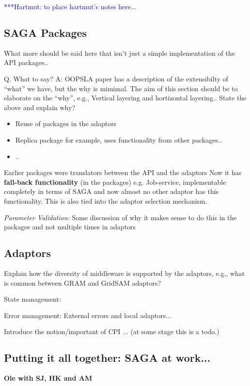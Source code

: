 \documentclass[10pt,letterpaper]{article}
\newcommand{\hknote}[1]{ {\textcolor{blue}    { ***Hartmut:   #1 }}}
\newcommand{\hknote}[1]{}
\begin{document}
\hknote{to place hartmut's notes here... }

\subsection{SAGA Packages}

What more should be said here that isn't just a simple implementation
of the API packages.. 

Q. What to say?  A: OOPSLA paper has a description of the extensibilty
of ``what'' we have, but the why is mimimal. The aim of this section
should be to elaborate on the ``why'', e.g., Vertical layering and
hortizontal layering..  State the above and explain why?

\begin{itemize}
\item Reuse of packages in the adaptors
\item Replica package for example, uses functionality from other packages..
\item ..
\end{itemize}

Earlier packages were translators between the API and the adaptors Now
it has {\bf fall-back functionality} (in the packages)
e.g. Job-service, implementable completely in terms of SAGA and now
almost no other adaptor has this functionality.  This is also tied
into the adaptor selection mechanism.

{\it Parameter Validation:} Some discussion of why it makes
sense to do this in the packages and not multiple times in adaptors

\subsection{Adaptors}

Explain how the diversity of middleware is supported by the adaptors,
e.g,, what is common between GRAM and GridSAM adaptors?

State management:

Error management: External errors and local adaptors...

Introduce the notion/important of CPI ... (at some stage this is a
todo.)

\subsection{Putting it all together: SAGA at work...}{\bf Ole with SJ,
  HK and AM}
\end{document}

